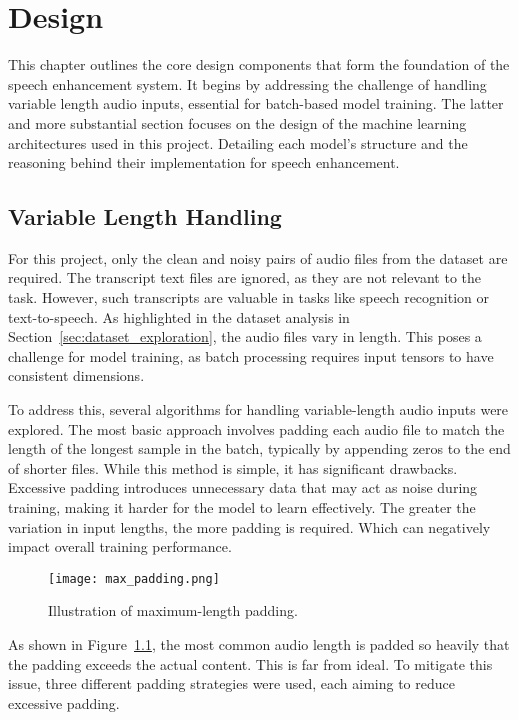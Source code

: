 \graphicspath{{content/chapters/5_design/figures/}}
\chapter{Design}
\label{chp:design}

This chapter outlines the core design components that form the foundation of the speech enhancement system. It begins by addressing the challenge of handling variable length audio inputs, essential for batch-based model training. The latter and more substantial section focuses on the design of the machine learning architectures used in this project. Detailing each model's structure and the reasoning behind their implementation for speech enhancement.

\section{Variable Length Handling}
\label{sec:variable_length_handling}

For this project, only the clean and noisy pairs of audio files from the dataset are required. The transcript text files are ignored, as they are not relevant to the task. However, such transcripts are valuable in tasks like speech recognition or text-to-speech. As highlighted in the dataset analysis in Section~\ref{sec:dataset_exploration}, the audio files vary in length. This poses a challenge for model training, as batch processing requires input tensors to have consistent dimensions.

To address this, several algorithms for handling variable-length audio inputs were explored. The most basic approach involves padding each audio file to match the length of the longest sample in the batch, typically by appending zeros to the end of shorter files. While this method is simple, it has significant drawbacks. Excessive padding introduces unnecessary data that may act as noise during training, making it harder for the model to learn effectively. The greater the variation in input lengths, the more padding is required. Which can negatively impact overall training performance.

\begin{figure}[h]
    \centering
    \texttt{[image: max\_padding.png]}
    \caption{\label{fig:max_padding}Illustration of maximum-length padding.}
\end{figure}

As shown in Figure~\ref{fig:max_padding}, the most common audio length is padded so heavily that the padding exceeds the actual content. This is far from ideal. To mitigate this issue, three different padding strategies were used, each aiming to reduce excessive padding.

